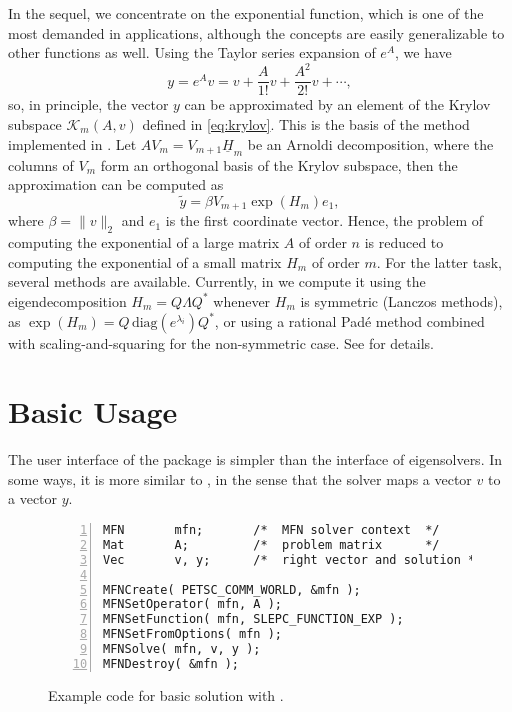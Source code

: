 In the sequel, we concentrate on the exponential function, which is one of the most demanded in applications, although the concepts are easily generalizable to other functions as well. Using the Taylor series expansion of $e^A$, we have
\begin{equation}
y=e^Av=v+\frac{A}{1!}v+\frac{A^2}{2!}v+\cdots,
\end{equation}
so, in principle, the vector $y$ can be approximated by an element of the Krylov subspace $\mathcal{K}_m(A,v)$ defined in \eqref{eq:krylov}. This is the basis of the method implemented in \expokit \citep{Sidje:1998:ESP}. Let $AV_m=V_{m+1}\underline{H}_m$ be an Arnoldi decomposition, where the columns of $V_m$ form an orthogonal basis of the Krylov subspace, then the approximation can be computed as
\begin{equation}
\tilde y=\beta V_{m+1}\exp(H_m)e_1,
\end{equation}
where $\beta=\|v\|_2$ and $e_1$ is the first coordinate vector. Hence, the problem of computing the exponential of a large matrix $A$ of order $n$ is reduced to computing the exponential of a small matrix $H_m$ of order $m$. For the latter task, several methods are available. Currently, in \slepc we compute it using the eigendecomposition $H_m=Q\Lambda Q^*$ whenever $H_m$ is symmetric (Lanczos methods), as $\exp(H_m)=Q\,\mathrm{diag}(e^{\lambda_i})Q^*$, or using a rational Pad\'e method combined with scaling-and-squaring for the non-symmetric case. See \citep{Higham:2010:CMF} for details.

\section{Basic Usage}

The user interface of the  package is simpler than the interface of eigensolvers. In some ways, it is more similar to , in the sense that the solver maps a vector $v$ to a vector $y$. 

\begin{figure}
\begin{Verbatim}[fontsize=\small,numbers=left,numbersep=6pt,xleftmargin=15mm]
MFN       mfn;       /*  MFN solver context  */
Mat       A;         /*  problem matrix      */
Vec       v, y;      /*  right vector and solution */

MFNCreate( PETSC_COMM_WORLD, &mfn );
MFNSetOperator( mfn, A );
MFNSetFunction( mfn, SLEPC_FUNCTION_EXP );
MFNSetFromOptions( mfn );
MFNSolve( mfn, v, y );
MFNDestroy( &mfn );
\end{Verbatim}
\caption{\label{fig:ex-mfn}Example code for basic solution with .}
\end{figure}

